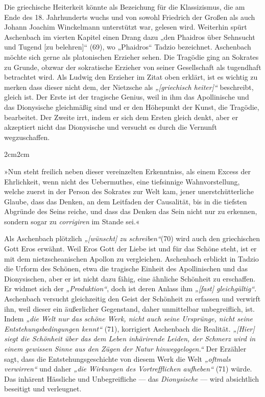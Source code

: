 \documentclass[12pt,a4paper]{article}
\newenvironment{longquote}
{%
    \vspace{-1.5em}
    \begin{adjustwidth}{2cm}{2cm}
        \fontsize{10}{12}\selectfont
        \singlespacing
        \itshape
    }
{%
    \end{adjustwidth}
}
\begin{document}
\noindent Die griechische Heiterkeit könnte als Bezeichung für die Klassizismus, die am Ende des 18. Jahrhunderts wuchs und von sowohl Friedrich der Großen als auch Johann Joachim Winckelmann unterstützt war, gelesen wird. Weiterhin spürt Aschenbach im vierten Kapitel einen Drang dazu „den Phaidros über Sehnsucht und Tugend [zu belehren]“ (69), wo „Phaidros“ Tadzio bezeichnet. Aschenbach möchte sich gerne als platonischen Erzieher sehen. Die Tragödie ging an Sokrates zu Grunde\autocite[85]{nietzsche1920}, obzwar der sokratische Erzieher von seiner Gesellschaft als tugendhaft betrachtet wird. Als Ludwig den Erzieher im Zitat oben\autocite[13]{ludwig} erklärt, ist es wichtig zu merken dass dieser nicht dem, der Nietzsche als \textit{„[griechisch heiter]“} beschreibt, gleich ist. Der Erste ist der tragische Genius, weil in ihm das Apollinische und das Dionysische gleichmäßig sind und er den Höhepunkt der Kunst, die Tragödie, bearbeitet. Der Zweite irrt, indem er sich dem Ersten gleich denkt, aber er akzeptiert nicht das Dionysische und versucht es durch die Vernunft wegzuschaffen.

\begin{longquote}
    »Nun steht freilich neben dieser vereinzelten Erkenntniss, als einem Excess der Ehrlichkeit, wenn nicht des Uebermuthes, eine tiefsinnige Wahnvorstellung, welche zuerst in der Person des Sokrates zur Welt kam, jener unerstchütterliche Glaube, dass das Denken, an dem Leitfaden der Causalität, bis in die tiefsten Abgründe des Seins reiche, und dass das Denken das Sein nicht nur zu erkennen, sondern sogar zu \textit{corrigiren} im Stande sei.«\autocite[102]{nietzsche1920}
\end{longquote}

Als Aschenbach plötzlich \textit{„[wünscht] zu schreiben“}(70) wird auch den griechischen Gott Eros erwähnt. Weil Eros Gott der Liebe ist und für das Schöne steht, ist er mit dem nietzscheanischen Apollon zu vergleichen. Aschenbach erblickt in Tadzio die Urform des Schönen, etwa die tragische Einheit des Apollinischen und das Dionysischen, aber er ist nicht dazu fähig, eine ähnliche Schönheit zu erschaffen. Er widmet sich der \textit{„Produktion“}, doch ist deren Anlass ihm \textit{„[fast] gleichgültig“}. Aschenbach versucht gleichzeitig den Geist der Schönheit zu erfassen und verwirft ihn, weil dieser ein äußerlicher Gegenstand, daher unmittelbar unbegreiflich, ist. Indem \textit{„die Welt nur das schöne Werk, nicht auch seine Ursprünge, nicht seine Entstehungsbedingungen kennt“} (71), korrigiert Aschenbach die Realität. \textit{„[Hier] siegt die Schönheit über das dem Leben inhärirende Leiden, der Schmerz wird in einem gewissen Sinne aus den Zügen der Natur hinweggelogen.“}\autocite[113]{nietzsche1920} Der Erzähler sagt, dass die Entstehungsgeschichte von diesem Werk die Welt \textit{„oftmals verwirren“} und daher \textit{„die Wirkungen des Vortrefflichen aufheben“} (71) würde. Das inhärent Hässliche und Unbegreifliche — das \textit{Dionysische} — wird absichtlich beseitigt und verleugnet.
\end{document}

